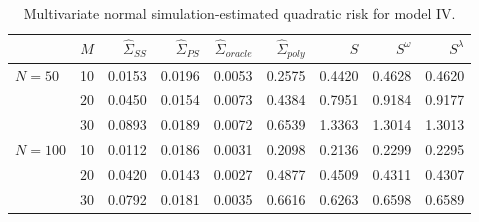 \begin{table}[H]
\centering
\caption{Multivariate normal simulation-estimated quadratic risk  for model IV.} 
\begin{tabular}{lrrrrrrrr}
  & $M$ &$\hat{\Sigma}_{SS}$& $\hat{\Sigma}_{PS}$ &$\hat{\Sigma}_{oracle}$& $\hat{\Sigma}_{poly}$ & $S$ &$S^\omega$& $S^\lambda$ \\ 
  \hline
$N = 50$ & 10 & 0.0153 & 0.0196 & 0.0053 & 0.2575 & 0.4420 & 0.4628 & 0.4620 \\ 
  & $20$ & 0.0450 & 0.0154 & 0.0073 & 0.4384 & 0.7951 & 0.9184 & 0.9177 \\ 
  & $30$ & 0.0893 & 0.0189 & 0.0072 & 0.6539 & 1.3363 & 1.3014 & 1.3013 \\ 
 $N = 100$ & 10 & 0.0112 & 0.0186 & 0.0031 & 0.2098 & 0.2136 & 0.2299 & 0.2295 \\ 
    &    $20$ & 0.0420 & 0.0143 & 0.0027 & 0.4877 & 0.4509 & 0.4311 & 0.4307 \\ 
    &    $30$ & 0.0792 & 0.0181 & 0.0035 & 0.6616 & 0.6263 & 0.6598 & 0.6589 \\ 
   \hline
\end{tabular}
\label{table:simulation-1-quad-loss-sigma-4}
\end{table}

